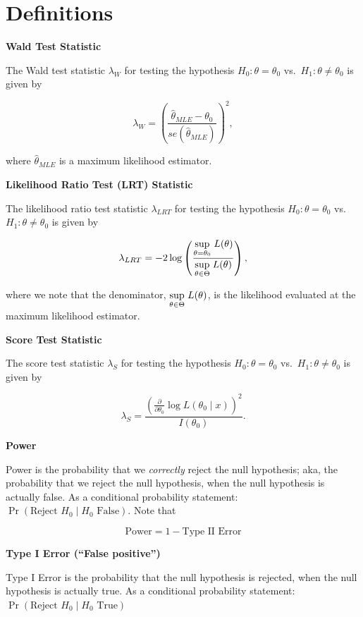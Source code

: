 \documentclass[
  letterpaper,
  DIV=11,
  numbers=noendperiod]{scrreprt}
\begin{document}
\section{Definitions}\label{definitions-6}

\textbf{Wald Test Statistic}

The Wald test statistic \(\lambda_W\) for testing the hypothesis
\(H_0: \theta = \theta_0\) vs.~\(H_1: \theta \neq \theta_0\) is given by

\[
\lambda_W = \left(\frac{\hat{\theta}_{MLE} - \theta_0}{se(\hat{\theta}_{MLE})}\right)^2,
\]

where \(\hat{\theta}_{MLE}\) is a maximum likelihood estimator.

\textbf{Likelihood Ratio Test (LRT) Statistic}

The likelihood ratio test statistic \(\lambda_{LRT}\) for testing the
hypothesis \(H_0: \theta = \theta_0\) vs.~\(H_1: \theta \neq \theta_0\)
is given by

\[
\lambda_{LRT} = -2 \log\left(\frac{\underset{\theta = \theta_0}{\text{sup}} \hspace{1mm} L(\theta)}{\underset{\theta \in \Theta}{\text{sup}} \hspace{1mm} L(\theta)}\right),
\]

where we note that the denominator,
\(\underset{\theta \in \Theta}{\text{sup}} \hspace{1mm} L(\theta)\), is
the likelihood evaluated at the maximum likelihood estimator.

\textbf{Score Test Statistic}

The score test statistic \(\lambda_S\) for testing the hypothesis
\(H_0: \theta = \theta_0\) vs.~\(H_1: \theta \neq \theta_0\) is given by

\[
\lambda_S = \frac{\left( \frac{\partial}{\partial \theta_0} \log L(\theta_0 \mid x) \right)^2}{I(\theta_0)}.
\]

\textbf{Power}

Power is the probability that we \emph{correctly} reject the null
hypothesis; aka, the probability that we reject the null hypothesis,
when the null hypothesis is actually false. As a conditional probability
statement: \(\Pr(\text{Reject }H_0 \mid H_0 \text{ False})\). Note that

\[
\text{Power} = 1 - \text{Type II Error}
\]

\textbf{Type I Error (``False positive'')}

Type I Error is the probability that the null hypothesis is rejected,
when the null hypothesis is actually true. As a conditional probability
statement: \(\Pr(\text{Reject }H_0 \mid H_0 \text{ True})\)
\end{document}
